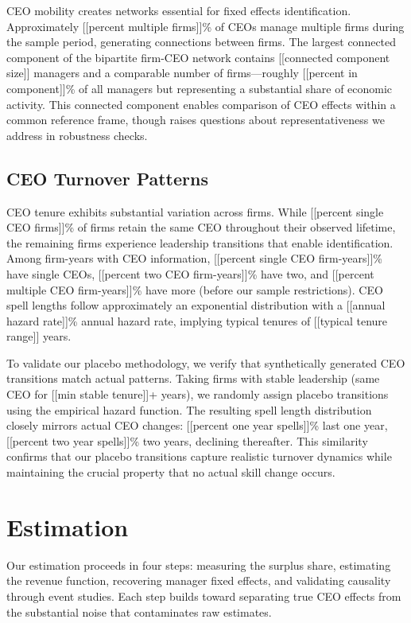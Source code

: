 \documentclass[11pt,a4paper]{article}
\begin{document}
CEO mobility creates networks essential for fixed effects identification. Approximately [[percent multiple firms]]\% of CEOs manage multiple firms during the sample period, generating connections between firms. The largest connected component of the bipartite firm-CEO network contains [[connected component size]] managers and a comparable number of firms—roughly [[percent in component]]\% of all managers but representing a substantial share of economic activity. This connected component enables comparison of CEO effects within a common reference frame, though raises questions about representativeness we address in robustness checks.

\subsection{CEO Turnover Patterns}

CEO tenure exhibits substantial variation across firms. While [[percent single CEO firms]]\% of firms retain the same CEO throughout their observed lifetime, the remaining firms experience leadership transitions that enable identification. Among firm-years with CEO information, [[percent single CEO firm-years]]\% have single CEOs, [[percent two CEO firm-years]]\% have two, and [[percent multiple CEO firm-years]]\% have more (before our sample restrictions). CEO spell lengths follow approximately an exponential distribution with a [[annual hazard rate]]\% annual hazard rate, implying typical tenures of [[typical tenure range]] years.

To validate our placebo methodology, we verify that synthetically generated CEO transitions match actual patterns. Taking firms with stable leadership (same CEO for [[min stable tenure]]+ years), we randomly assign placebo transitions using the empirical hazard function. The resulting spell length distribution closely mirrors actual CEO changes: [[percent one year spells]]\% last one year, [[percent two year spells]]\% two years, declining thereafter. This similarity confirms that our placebo transitions capture realistic turnover dynamics while maintaining the crucial property that no actual skill change occurs.

\section{Estimation}

Our estimation proceeds in four steps: measuring the surplus share, estimating the revenue function, recovering manager fixed effects, and validating causality through event studies. Each step builds toward separating true CEO effects from the substantial noise that contaminates raw estimates.
\end{document}
